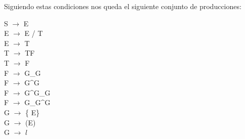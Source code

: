 \newpage
Siguiendo estas condiciones nos queda el siguiente conjunto de producciones:

\begin{center}
 S $\rightarrow$ E
\\ E $\rightarrow$ E / T
\\ E $\rightarrow$ T
\\ T $\rightarrow$ TF
\\ T $\rightarrow$ F
\\ F $\rightarrow$ G\_G
\\ F $\rightarrow$ G\textasciicircum G
\\ F $\rightarrow$ G\textasciicircum G\_G
\\ F $\rightarrow$ G\_G\textasciicircum G
\\ G $\rightarrow$ \{ E\}
\\ G $\rightarrow$ (E)
\\ G $\rightarrow$ $l$
\end{center}

